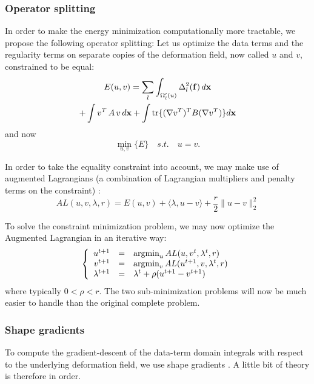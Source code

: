 \subsubsection{Operator splitting}
In order to make the energy minimization computationally more tractable, 
we propose the following operator splitting: Let us optimize the data terms 
and the regularity terms on separate copies of the deformation field, 
now called $u$ and $v$, constrained to be equal:
\begin{multline}
E(u,v) = \sum\limits_l \int_{\Omega'_l(u)} \Delta^2_l (\mathbf{f}) \,d\mathbf{x} \\
+ \int v^T \, A \, v \, d\mathbf{x} + \int \tr\{(\nabla v^T)^T B (\nabla v^T)\} d\mathbf{x}
\label{eq:operator_splitting}
\end{multline}
and now
\begin{equation}
\min_{u,v} \{ E \} \quad s.t. \quad u = v.
\end{equation}

In order to take the equality constraint into account, we may make use of 
augmented Lagrangians (a combination of Lagrangian multipliers and penalty 
terms on the constraint) \cite{bertsekas_multiplier_1976,
glowinski_augmented_1989,nocedal_numerical_2006}:
\begin{equation}
AL(u,v,\lambda,r) = E(u,v) + \langle \lambda, u-v \rangle + \frac{r}{2} \| u - v \|_2^2
\end{equation}

To solve the constraint minimization problem, we may now optimize the 
Augmented Lagrangian in an iterative way:
\begin{equation}
\left\lbrace 
\begin{array}{rcl}
u^{t+1} &=& \operatorname{argmin}_{u} AL(u,v^t,\lambda^t,r)\\
v^{t+1} &=& \operatorname{argmin}_{v} AL(u^{t+1},v,\lambda^t,r)\\
\lambda^{t+1} &=& \lambda^t + \rho(u^{t+1}-v^{t+1})
\end{array}\right.
\end{equation}
where typically $0 < \rho < r$. The two sub-minimization problems will 
now be much easier to handle than the original complete problem.

\subsubsection{Shape gradients}
To compute the gradient-descent of the data-term domain integrals with 
respect to the underlying deformation field, we use shape gradients 
\cite{jehan-besson_dream2s:_2003,herbulot_segmentation_2006}. A little 
bit of theory is therefore in order.

